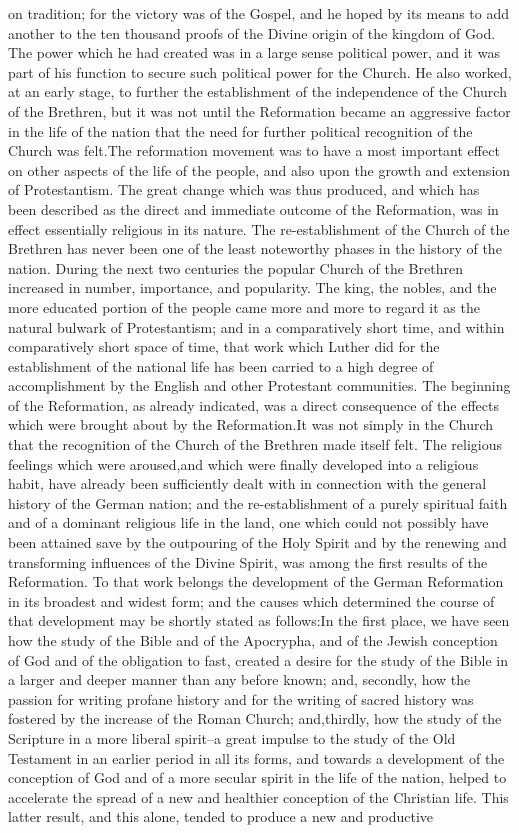 \documentclass[a4paper]{article}
\begin{document}
on tradition; for the victory was of the Gospel, and he hoped by its means to add another to the ten thousand proofs of the Divine origin of the kingdom of God. The power which he had created was in a large sense political power, and it was part of his function to secure such political power for the Church. He also worked, at an early stage, to further the establishment of the independence of the Church of the Brethren, but it was not until the Reformation became an aggressive factor in the life of the nation that the need for further political recognition of the Church was felt.The reformation movement was to have a most important effect on other aspects of the life of the people, and also upon the growth and extension of Protestantism. The great change which was thus produced, and which has been described as the direct and immediate outcome of the Reformation, was in effect essentially religious in its nature. The re-establishment of the Church of the Brethren has never been one of the least noteworthy phases in the history of the nation. During the next two centuries the popular Church of the Brethren increased in number, importance, and popularity. The king, the nobles, and the more educated portion of the people came more and more to regard it as the natural bulwark of Protestantism; and in a comparatively short time, and within comparatively short space of time, that work which Luther did for the establishment of the national life has been carried to a high degree of accomplishment by the English and other Protestant communities. The beginning of the Reformation, as already indicated, was a direct consequence of the effects which were brought about by the Reformation.It was not simply in the Church that the recognition of the Church of the Brethren made itself felt. The religious feelings which were aroused,and which were finally developed into a religious habit, have already been sufficiently dealt with in connection with the general history of the German nation; and the re-establishment of a purely spiritual faith and of a dominant religious life in the land, one which could not possibly have been attained save by the outpouring of the Holy Spirit and by the renewing and transforming influences of the Divine Spirit, was among the first results of the Reformation. To that work belongs the development of the German Reformation in its broadest and widest form; and the causes which determined the course of that development may be shortly stated as follows:In the first place, we have seen how the study of the Bible and of the Apocrypha, and of the Jewish conception of God and of the obligation to fast, created a desire for the study of the Bible in a larger and deeper manner than any before known; and, secondly, how the passion for writing profane history and for the writing of sacred history was fostered by the increase of the Roman Church; and,thirdly, how the study of the Scripture in a more liberal spirit--a great impulse to the study of the Old Testament in an earlier period in all its forms, and towards a development of the conception of God and of a more secular spirit in the life of the nation, helped to accelerate the spread of a new and healthier conception of the Christian life. This latter result, and this alone, tended to produce a new and productive 
\end{document}
